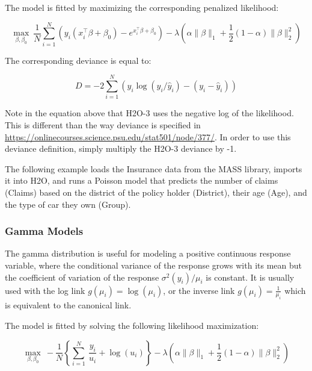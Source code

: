 The model is fitted by maximizing the corresponding penalized likelihood:

$$  \max_{\beta,\beta_0}  \ \frac{1}{N} \sum_{i=1}^{N}  \left(   y_i (x_i^{\top}\beta  + \beta_0) - e^{x_i^{\top}\beta  + \beta_0} \right) 
- \lambda \left(\alpha \|\beta \|_1 + \frac{1}{2}(1-\alpha) \| \beta \|_2^2 \right)$$

The corresponding deviance is equal to: 

$$D = -2\sum_{i=1}^{N} \left( y_i \log(y_i/\hat{y}_i) - ( y_i - \hat{y}_i  ) \right)$$

Note in the equation above that H2O-3 uses the negative log of the likelihood. This is different than the way deviance is specified in \url{https://onlinecourses.science.psu.edu/stat501/node/377/}. In order to use this deviance definition, simply multiply the H2O-3 deviance by -1.

The following example loads the Insurance data from the MASS library, imports it into H2O, and runs a Poisson model that predicts the number of claims (Claims) based on the district of the policy holder (District), their age (Age), and the type of car they
own (Group).

\waterExampleInR


\waterExampleInPython


\subsubsection{Gamma Models}
The gamma distribution is useful for modeling a positive continuous response variable, where the conditional
variance of the response grows with its mean but the coefficient of variation of the response $\sigma^2(y_i)/\mu_i$ is
constant. It is usually used with the log link $g(\mu_i)= \log(\mu_i)$, or the inverse link $g(\mu_i) = \frac{1}{\mu_i} $ which is equivalent to the canonical link.

The model is fitted by solving the following likelihood maximization:

$$  \max_{\beta,\beta_0} \  - \frac{1}{N} \left\{ \sum_{i=1}^N \ \frac{y_i}{u_i} + \log({u_i}) \right\}  - \lambda \left(  \alpha \| \beta \|_1 + \frac{1}{2}(1-\alpha)\| \beta \|_2^2  \right) $$

